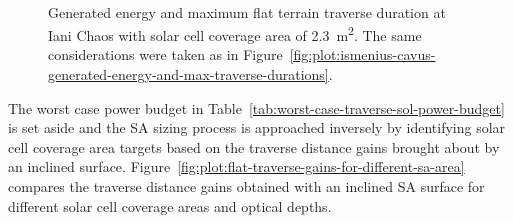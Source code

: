 \documentclass[twocolumn,letterpaper]{IEEEAerospaceCLS}  %
\newcommand{\refFig}[1]{{Figure}~\ref{#1}} %
\newcommand{\refTab}[1]{{Table}~\ref{#1}}  %
\newlength{\subfigureWidth}
\begin{document}
\begin{figure}[h]
\begin{subfigure}[t]{\subfigureWidth}
    \label{fig:plot:sub:iani-chaos-max-traverse-durations}
  \end{subfigure}\\[0.8ex]
  \caption{Generated energy and maximum flat terrain traverse duration at Iani Chaos with solar cell coverage area of \SI{2.3}{m^{2}}. The same considerations were taken as in \refFig{fig:plot:ismenius-cavus-generated-energy-and-max-traverse-durations}.}
  \label{fig:plot:iani-chaos-generated-energy-and-max-traverse-durations}
\end{figure}

The worst case power budget in \refTab{tab:worst-case-traverse-sol-power-budget} is set aside and the \ac{SA} sizing process is approached inversely by identifying solar cell coverage area targets based on the traverse distance gains brought about by an inclined surface. \refFig{fig:plot:flat-traverse-gains-for-different-sa-area} compares the traverse distance gains obtained with an inclined \ac{SA} surface for different solar cell coverage areas and optical depths.
\end{document}
